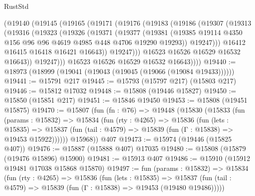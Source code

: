 \begin{lexlean}{RustStd}
\begin{coremodule}
          (@19140
            (@19145
              (@19165
                (@19171
                  (@19176
                    (@19183
                      (@19186
                        (@19307
                          (@19313
                            (@19316
                              (@19323
                                (@19326
                                  (@19371
                                    (@19377
                                      (@19381
                                        (@19385
                                          @19114
                                          @4350
                                          @156
                                          @96
                                          @96
                                          @4619
                                          @4985
                                          @448
                                          @4706
                                          @19290
                                          @19293))
                                      @19247)))
                                @16412
                                @16415
                                @16418
                                @16421
                                @16643))
                            @19247)))
                      @16523
                      @16526
                      @16529
                      @16532
                      @16643))
                  @19247)))
            @16523
            @16526
            @16529
            @16532
            @16643))))
@19440 := @18973 (@18999 (@19041 (@19043 (@19045 (@19066 (@19084 @19433))))))
@19441 := @15791 @217
@19445 := @15793 (@15797 @217) (@15803 @217)
@19446 := @15812 @17032
@19448 := @15808 (@19446 @15827)
@19450 := @15850 (@15851 @217)
@19451 := @15846 @19450
@19453 := @15808 (@19451 @15875)
@19470 := @15807
    (fun (fn : @76) =>
    @19448
      (@15830
        (@15833
          (fun (params : @15832) =>
          @15834
            (fun (rty : @4265) =>
            @15836
              (fun (lets : @15835) =>
              @15837 (fun (tail : @4579) => @15839 (fun (Γ : @15838) => @19453 @15922))))))
        @15968))
    @407
@19473 := @15974 (@19446 (@15825 @407))
@19476 := @15887 (@15888 @407) @17035
@19480 := @15808 (@15879 (@19476 @15896) @15900)
@19481 := @15913 @407
@19486 := @15910 (@15912 @19481 @17038 @15868 @15870)
@19497 := fun (params : @15832) =>
  @15834
    (fun (rty : @4265) =>
    @15836
      (fun (lets : @15835) =>
      @15837 (fun (tail : @4579) => @15839 (fun (Γ : @15838) => @19453 (@19480 @19486)))))

\end{coremodule}
\end{lexlean}
